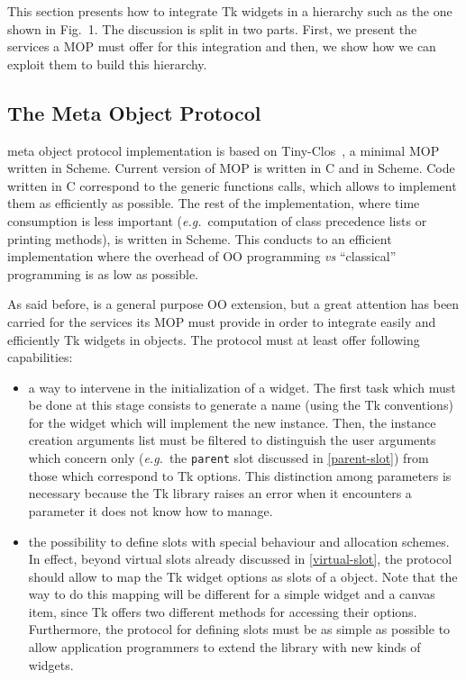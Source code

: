 {This section presents how to integrate Tk widgets in a hierarchy such
as the one shown in Fig.~1. The discussion is split in two
parts. First, we present the services a MOP must offer for this
integration and then, we show how we can exploit them to build
this hierarchy.

\subsection{The {\stklos} Meta Object Protocol}

{\stklos} meta object protocol implementation is based on
Tiny-Clos~\cite{Tiny-Clos}, a minimal MOP written in Scheme. Current
version of {\stklos} MOP is written in C and in Scheme. Code written in C
correspond to the generic functions calls, which allows to implement them
as efficiently as possible.  The rest of the implementation, where time
consumption is less important ({\em e.g.}~computation of class
precedence lists or printing methods), is written in Scheme. This conducts
to an efficient implementation where the overhead of OO programming {\it
vs} ``classical'' programming is as low as possible.

As said before, {\stklos} is a general purpose OO extension, but a great
attention has been carried for the services its MOP must provide in order
to integrate easily and efficiently Tk widgets in {\stklos} objects. The
{\stklos} protocol must at least offer following capabilities:
\begin{itemize}
\item a way to  intervene in the initialization of a {\stklos} widget.
The first task which must be done at this stage consists to generate a
name (using the Tk conventions) for the widget which will implement
the new instance. Then, the instance creation arguments list must be
filtered to distinguish the user arguments which concern only
{\stklos} ({\em e.g.}~the {\tt parent} slot discussed in
\ref{parent-slot}) from those which correspond to Tk
options. This distinction among parameters is necessary because the Tk
library raises an error when it encounters a parameter it does not know
how to manage.

\item the possibility to define slots with special behaviour and
allocation schemes. In effect, beyond virtual slots already discussed
in \ref{virtual-slot}, the protocol should allow to map the Tk widget
options  as slots of a {\stklos} object. Note that the
way to do this mapping will be different for a simple widget and a
canvas item, since Tk offers two different methods for accessing their
options. Furthermore, the protocol for defining slots must be as
simple as possible to allow application programmers to extend the
library with new kinds of widgets.
\end{itemize}

}
